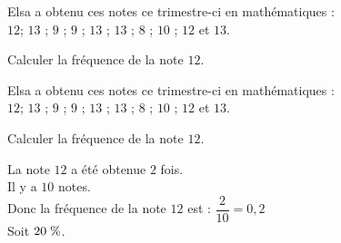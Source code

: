 \begin{exercice*}[Notes]
    Elsa a obtenu ces notes ce trimestre-ci en mathématiques :\\
    $12$; $13$ ; $9$ ; $9$ ; $13$ ; $13$ ; $8$ ; $10$ ; $12$ et $13$.
    
    \medskip
    Calculer la fréquence de la note $12$.

\end{exercice*}
\begin{corrige}
    Elsa a obtenu ces notes ce trimestre-ci en mathématiques :\\
    $12$; $13$ ; $9$ ; $9$ ; $13$ ; $13$ ; $8$ ; $10$ ; $12$ et $13$.
    
    \medskip
    Calculer la fréquence de la note $12$.
    
    {\red
    \begin{spacing}{1.5}
        La note $12$ a été obtenue $2$ fois.\\
         Il y a $10$ notes.\\
        Donc la fréquence de la note $12$ est : $\dfrac{2}{10}$$=0{,}2$\\
        Soit $20\thickspace\%$.
    \end{spacing}
    }
\end{corrige}

